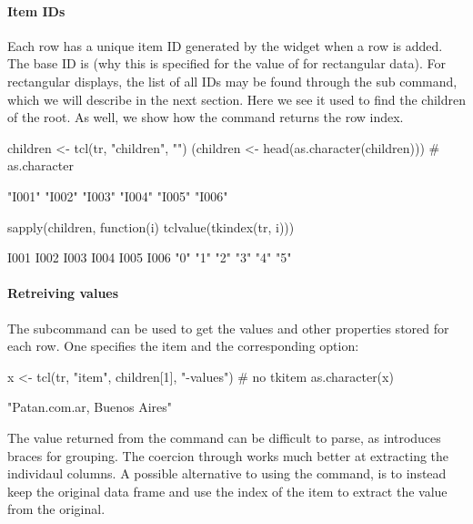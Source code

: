 \paragraph{Item IDs}
Each row has a unique item ID generated by the widget when a row is
added. The base ID is \qcode{} (why this is specified for the value of
 for rectangular data). For rectangular displays, the
list of all IDs may be found through the 
sub command, which we will describe in the next section.  Here we see
it used to find the children of the root. As well, we show how the
 command returns the row index.
\begin{Schunk}
\begin{Sinput}
 children <- tcl(tr, "children", "")
 (children <- head(as.character(children)))     # as.character
\end{Sinput}
\begin{Soutput}
[1] "I001" "I002" "I003" "I004" "I005" "I006"
\end{Soutput}
\begin{Sinput}
 sapply(children, function(i) tclvalue(tkindex(tr, i)))
\end{Sinput}
\begin{Soutput}
I001 I002 I003 I004 I005 I006 
 "0"  "1"  "2"  "3"  "4"  "5" 
\end{Soutput}
\end{Schunk}

\paragraph{Retreiving values}
The  subcommand can be used to get the
values and other properties stored for each row. One specifies the item and the
corresponding option:
\begin{Schunk}
\begin{Sinput}
 x <- tcl(tr, "item", children[1], "-values") # no tkitem
 as.character(x)
\end{Sinput}
\begin{Soutput}
[1] "Patan.com.ar, Buenos Aires"
\end{Soutput}
\end{Schunk}
The value returned from the  command can be difficult to parse, as \TCL\/ introduces braces for grouping. The coercion through  works much better at extracting the individaul columns. A possible alternative to using the  command, is to instead keep the original data frame and use the index of the item to extract the value from the original.

